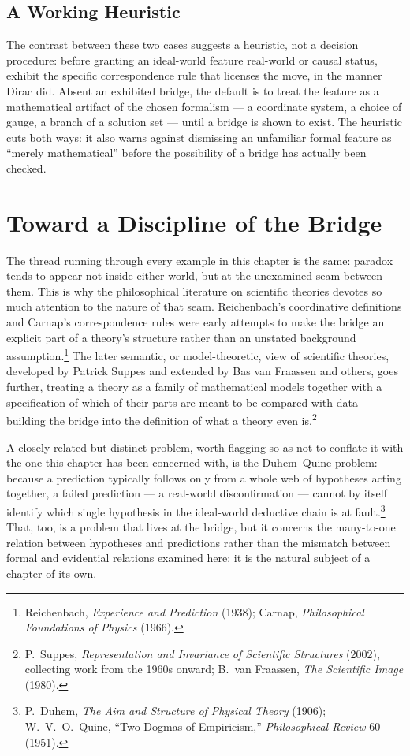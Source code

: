 \documentclass[11pt]{book}
\begin{document}
\subsection{A Working Heuristic}

The contrast between these two cases suggests a heuristic, not a decision procedure: before granting an ideal-world feature real-world or causal status, exhibit the specific correspondence rule that licenses the move, in the manner Dirac did. Absent an exhibited bridge, the default is to treat the feature as a mathematical artifact of the chosen formalism --- a coordinate system, a choice of gauge, a branch of a solution set --- until a bridge is shown to exist. The heuristic cuts both ways: it also warns against dismissing an unfamiliar formal feature as ``merely mathematical'' before the possibility of a bridge has actually been checked.

\section{Toward a Discipline of the Bridge}

The thread running through every example in this chapter is the same: paradox tends to appear not inside either world, but at the unexamined seam between them. This is why the philosophical literature on scientific theories devotes so much attention to the nature of that seam. Reichenbach's coordinative definitions and Carnap's correspondence rules were early attempts to make the bridge an explicit part of a theory's structure rather than an unstated background assumption.\footnote{Reichenbach, \emph{Experience and Prediction} (1938); Carnap, \emph{Philosophical Foundations of Physics} (1966).} The later semantic, or model-theoretic, view of scientific theories, developed by Patrick Suppes and extended by Bas van Fraassen and others, goes further, treating a theory as a family of mathematical models together with a specification of which of their parts are meant to be compared with data --- building the bridge into the definition of what a theory even is.\footnote{P.\ Suppes, \emph{Representation and Invariance of Scientific Structures} (2002), collecting work from the 1960s onward; B.\ van Fraassen, \emph{The Scientific Image} (1980).}

A closely related but distinct problem, worth flagging so as not to conflate it with the one this chapter has been concerned with, is the Duhem--Quine problem: because a prediction typically follows only from a whole web of hypotheses acting together, a failed prediction --- a real-world disconfirmation --- cannot by itself identify which single hypothesis in the ideal-world deductive chain is at fault.\footnote{P.\ Duhem, \emph{The Aim and Structure of Physical Theory} (1906); W.\ V.\ O.\ Quine, ``Two Dogmas of Empiricism,'' \emph{Philosophical Review} 60 (1951).} That, too, is a problem that lives at the bridge, but it concerns the many-to-one relation between hypotheses and predictions rather than the mismatch between formal and evidential relations examined here; it is the natural subject of a chapter of its own.
\end{document}
